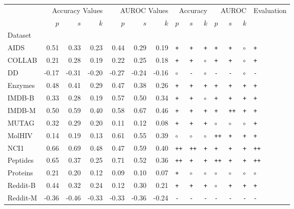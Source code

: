 \begin{tabular}{lrrrrrrlllllll}
\toprule
 & \multicolumn{3}{r}{Accuracy Values} & \multicolumn{3}{r}{AUROC Values} & \multicolumn{3}{r}{Accuracy} & \multicolumn{3}{r}{AUROC} & Evaluation \\
 & $p$ & $s$ & $k$ & $p$ & $s$ & $k$ & $p$ & $s$ & $k$ & $p$ & $s$ & $k$ &  \\
Dataset &  &  &  &  &  &  &  &  &  &  &  &  &  \\
\midrule
AIDS & 0.51 & 0.33 & 0.23 & 0.44 & 0.29 & 0.19 & \texttt{+} & \texttt{+} & \texttt{+} & \texttt{+} & \texttt{+} & $\circ$ & \texttt{+} \\
COLLAB & 0.21 & 0.28 & 0.19 & 0.22 & 0.25 & 0.18 & \texttt{+} & \texttt{+} & $\circ$ & \texttt{+} & \texttt{+} & $\circ$ & \texttt{+} \\
DD & -0.17 & -0.31 & -0.20 & -0.27 & -0.24 & -0.16 & $\circ$ & \texttt{-} & $\circ$ & \texttt{-} & \texttt{-} & $\circ$ & \texttt{-} \\
Enzymes & 0.48 & 0.41 & 0.29 & 0.47 & 0.38 & 0.26 & \texttt{+} & \texttt{+} & \texttt{+} & \texttt{+} & \texttt{+} & \texttt{+} & \texttt{+} \\
IMDB-B & 0.33 & 0.28 & 0.19 & 0.57 & 0.50 & 0.34 & \texttt{+} & \texttt{+} & $\circ$ & \texttt{+} & \texttt{+} & \texttt{+} & \texttt{+} \\
IMDB-M & 0.50 & 0.59 & 0.40 & 0.58 & 0.67 & 0.46 & \texttt{+} & \texttt{+} & \texttt{+} & \texttt{+} & \texttt{++} & \texttt{+} & \texttt{+} \\
MUTAG & 0.32 & 0.29 & 0.20 & 0.11 & 0.12 & 0.08 & \texttt{+} & \texttt{+} & \texttt{+} & $\circ$ & $\circ$ & $\circ$ & \texttt{+} \\
MolHIV & 0.14 & 0.19 & 0.13 & 0.61 & 0.55 & 0.39 & $\circ$ & $\circ$ & $\circ$ & \texttt{++} & \texttt{+} & \texttt{+} & \texttt{+} \\
NCI1 & 0.66 & 0.69 & 0.48 & 0.47 & 0.59 & 0.40 & \texttt{++} & \texttt{++} & \texttt{+} & \texttt{+} & \texttt{+} & \texttt{+} & \texttt{++} \\
Peptides & 0.65 & 0.37 & 0.25 & 0.71 & 0.52 & 0.36 & \texttt{++} & \texttt{+} & \texttt{+} & \texttt{++} & \texttt{+} & \texttt{+} & \texttt{++} \\
Proteins & 0.21 & 0.20 & 0.12 & 0.09 & 0.10 & 0.07 & \texttt{+} & $\circ$ & $\circ$ & $\circ$ & $\circ$ & $\circ$ & $\circ$ \\
Reddit-B & 0.44 & 0.32 & 0.24 & 0.12 & 0.30 & 0.21 & \texttt{+} & \texttt{+} & \texttt{+} & $\circ$ & \texttt{+} & \texttt{+} & \texttt{+} \\
Reddit-M & -0.36 & -0.46 & -0.33 & -0.33 & -0.36 & -0.24 & \texttt{-} & \texttt{-} & \texttt{-} & \texttt{-} & \texttt{-} & \texttt{-} & \texttt{-} \\
\bottomrule
\end{tabular}
